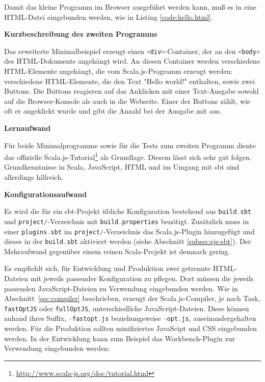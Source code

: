 \documentclass[a4paper, 12pt, hidelinks, listof=totoc, listoftables=totoc, bibliography=totoc]{scrreprt}
\newcommand{\code}[1]{\lstinline[language=Scala, style=inline]|#1|}
\newcommand{\MyMiniSec}[1]{\rmfamily\fontsize{12}{15}\selectfont
	\vspace{7pt}\textbf{#1} %
}
\begin{document}
Damit das kleine Programm im Browser ausgeführt werden kann, muß es in eine \ac{HTML}-Datei eingebunden werden, wie in Listing \ref{code:hello.html}.




\MyMiniSec{Kurzbeschreibung des zweiten Programms}

Das erweiterte Minimalbeispiel erzeugt einen \code{<div>}-Container, der an den \code{<body>} des \ac{HTML}-Dokuments angehängt wird. An diesen Container werden verschiedene \ac{HTML}-Elemente angehängt, die vom Scala.js-Programm erzeugt werden: verschiedene \ac{HTML}-Elemente, die den Text "Hello world!" enthalten, sowie zwei Buttons. Die Buttons reagieren auf das Anklicken mit einer Text-Ausgabe sowohl auf die Browser-Konsole als auch in die Webseite. Einer der Buttons zählt, wie oft er angeklickt wurde und gibt die Anzahl bei der Ausgabe mit aus.


\MyMiniSec{Lernaufwand}

Für beide Minimalprogramme sowie für die Tests zum zweiten Programm diente das offizielle Scala.js-Tutorial\footnote{\url{http://www.scala-js.org/doc/tutorial.html}} als Grundlage. Diesem lässt sich sehr gut folgen. Grundkenntnisse in Scala, JavaScript, \ac{HTML} und im Umgang mit sbt sind allerdings hilfreich.


\MyMiniSec{Konfigurationsaufwand}

Es wird die für ein sbt-Projekt übliche Konfiguration bestehend aus \code{build.sbt} und \code{project/}-Verzeichnis mit \code{build.properties} benötigt. Zusätzlich muss in einer \code{plugins.sbt} im \code{project/}-Verzeichnis das Scala.js-Plugin hinzugefügt und dieses in der \code{build.sbt} aktiviert werden (siehe Abschnitt \ref{subsec:sjs-sbt}). Der Mehraufwand gegenüber einem reinen Scala-Projekt ist demnach gering. 

Es empfiehlt sich, für Entwicklung und Produktion zwei getrennte \ac{HTML}-Dateien mit jeweils passender Konfiguration zu pflegen. Dort müssen die jeweils passenden JavaScript-Dateien zu Verwendung eingebunden werden. Wie in Abschnitt~\ref{sec:compiler} beschrieben, erzeugt der Scala.js-Compiler, je nach Task, \code{fastOptJS} oder \code{fullOptJS}, unterschiedliche JavaScript-Dateien. Diese können anhand ihres Suffix, \code{-fastopt.js} beziehungsweise \code{-opt.js}, auseinandergehalten werden. Für die Produktion sollten minifiziertes JavaScipt und \ac{CSS} eingebunden werden. In der Entwicklung kann zum Beispiel das Workbench-Plugin zur Verwendung eingebunden werden:
\end{document}
